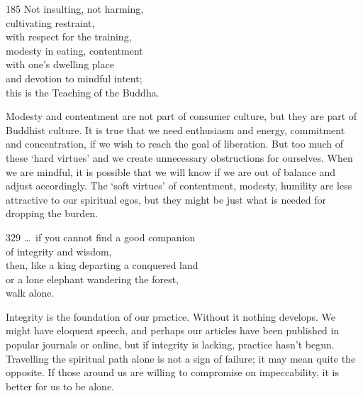 
\begin{dhpVerse}{185}
\label{dhp-185}
Not insulting, not harming,\\
cultivating restraint,\\
with respect for the training,\\
modesty in eating, contentment\\
with one's dwelling place\\
and devotion to mindful intent;\\
this is the Teaching of the Buddha.
\end{dhpVerse}

\begin{dhpRefl}
  Modesty and contentment are not part of consumer culture, but they are part of
  Buddhist culture. It is true that we need enthusiasm and energy, commitment
  and concentration, if we wish to reach the goal of liberation. But too much of
  these ‘hard virtues’ and we create unnecessary obstructions for ourselves.
  When we are mindful, it is possible that we will know if we are out of balance
  and adjust accordingly. The ‘soft virtues’ of contentment, modesty, humility
  are less attractive to our spiritual egos, but they might be just what is
  needed for dropping the burden.
\end{dhpRefl}


\begin{dhpVerse}{329}
\label{dhp-329}
\ldots\ if you cannot find a good companion\\
of integrity and wisdom,\\
then, like a king departing a conquered land\\
or a lone elephant wandering the forest,\\
walk alone.
\end{dhpVerse}

\begin{dhpRefl}
  Integrity is the foundation of our practice. Without it nothing develops. We
  might have eloquent speech, and perhaps our articles have been published in
  popular journals or online, but if integrity is lacking, practice hasn’t
  begun. Travelling the spiritual path alone is not a sign of failure; it may
  mean quite the opposite. If those around us are willing to compromise on
  impeccability, it is better for us to be alone.
\end{dhpRefl}


